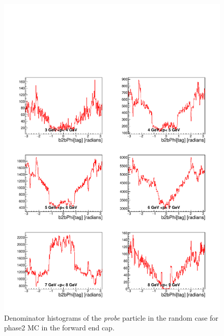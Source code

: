 \documentclass[a4paper,11pt,twosided,final,german,openbib,pdftex,listof=totoc,bibliography=totoc]{scrbook}
\begin{document}
\begin{appendix}
\begin{figure}[!htbp]
	\centering
	\includegraphics[width=\textwidth]{Plots/master/xPMPhiRandomFCD_MC}
	\caption[Momentum $\phi$ Random Forward End Cap Denominator Histogram Phase2 MC]{Denominator histograms of the \textit{probe} particle in the random case for phase2 MC in the forward end cap.}
	\label{plt:PMPhiRandomFCD_MC}
\end{figure}



\end{appendix}
\end{document}
